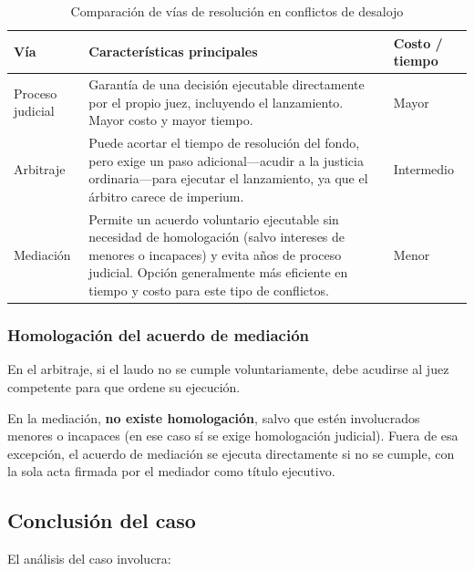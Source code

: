 \documentclass[12pt,oneside]{book}
\begin{document}
\begin{table}[H]
\centering
\begin{tabularx}{\textwidth}{
    >{\raggedright\arraybackslash}p{}
    >{\raggedright\arraybackslash}X
    >{\raggedright\arraybackslash}p{}
}
\toprule
\textbf{Vía} & \textbf{Características principales} & \textbf{Costo / tiempo} \\
\midrule
Proceso judicial & Garantía de una decisión ejecutable directamente por el propio juez, incluyendo el lanzamiento. Mayor costo y mayor tiempo. & Mayor \\
\addlinespace
Arbitraje & Puede acortar el tiempo de resolución del fondo, pero exige un paso adicional---acudir a la justicia ordinaria---para ejecutar el lanzamiento, ya que el árbitro carece de imperium. & Intermedio \\
\addlinespace
Mediación & Permite un acuerdo voluntario ejecutable sin necesidad de homologación (salvo intereses de menores o incapaces) y evita años de proceso judicial. Opción generalmente más eficiente en tiempo y costo para este tipo de conflictos. & Menor \\
\bottomrule
\end{tabularx}
\caption{Comparación de vías de resolución en conflictos de desalojo}
\end{table}

\subsubsection{Homologaci\'on del acuerdo de mediaci\'on}

\begin{note}
En el arbitraje, si el laudo no se cumple voluntariamente, debe
acudirse al juez competente para que ordene su ejecución.

En la mediación, \textbf{no existe homologación}, salvo que estén
involucrados menores o incapaces (en ese caso sí se exige homologación
judicial). Fuera de esa excepción, el acuerdo de mediación se ejecuta
directamente si no se cumple, con la sola acta firmada por el mediador
como título ejecutivo.
\end{note}

\subsection{Conclusi\'on del caso}

El análisis del caso involucra:
\end{document}
